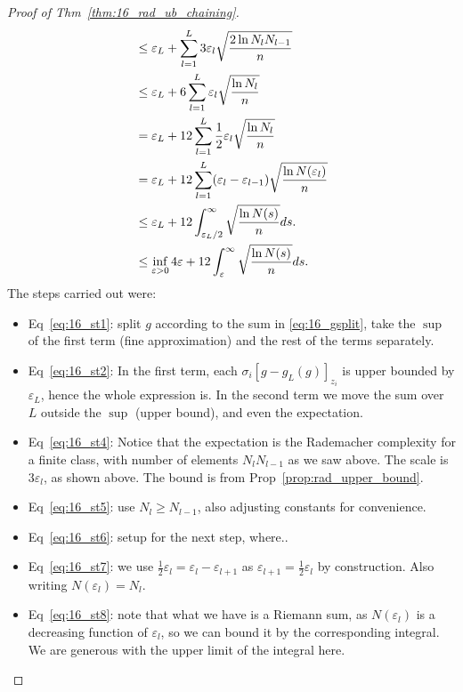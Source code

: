 \documentclass[twoside]{article}
\begin{document}
\begin{proof}[Proof of Thm~\ref{thm:16_rad_ub_chaining}]
\begin{align}
            & \leq \varepsilon_L + \sum_{l=1}^L  3 \varepsilon_l \sqrt{\frac{2 \ln N_l N_{l-1}}{n}}   \label{eq:16_st4}  \\
            & \leq \varepsilon_L + 6 \sum_{l=1}^L \varepsilon_l \sqrt{\frac{ \ln N_l }{n}}   \label{eq:16_st5}  \\
            & = \varepsilon_L + 12 \sum_{l=1}^L \frac12 \varepsilon_l \sqrt{\frac{ \ln N_l }{n}}   \label{eq:16_st6}  \\    
            & = \varepsilon_L + 12 \sum_{l=1}^L (\varepsilon_l-\varepsilon_{l-1}) \sqrt{\frac{ \ln N(\varepsilon_l) }{n}}   \label{eq:16_st7} \\    
            & \leq \varepsilon_L + 12 \int_{\varepsilon_L/2}^\infty \sqrt{\frac{ \ln N(s) }{n}} ds.   \label{eq:16_st8}  \\ 
            & \leq \inf_{\varepsilon > 0} 4 \varepsilon + 12 \int_\varepsilon^\infty \sqrt{ \frac{\ln N(s)}{n} } ds.      \label{eq:16_st9}     
    \end{align}
    The steps carried out were:
    \begin{itemize}
        \item Eq~\ref{eq:16_st1}: split $g$ according to the sum in \ref{eq:16_gsplit}, take the $\sup$ of the first term (fine approximation) and the rest of the terms separately.
        \item Eq~\ref{eq:16_st2}: In the first term, each $\sigma_i [g - g_L(g)]_{z_i}$ is upper bounded by $\varepsilon_L$, hence the whole expression is. In the second term we move the sum over $L$ outside the $\sup$ (upper bound), and even the expectation.
        \item Eq~\ref{eq:16_st4}: Notice that the expectation is the Rademacher complexity for a finite class, with number of elements $N_l N_{l-1}$ as we saw above. The scale is $3 \varepsilon_l$, as shown above. The bound is from Prop~\ref{prop:rad_upper_bound}. 
        \item Eq~\ref{eq:16_st5}: use $N_l \geq N_{l-1}$, also adjusting constants for convenience.
        \item Eq~\ref{eq:16_st6}: setup for the next step, where..
        \item Eq~\ref{eq:16_st7}: we use $\frac12 \varepsilon_l = \varepsilon_l - \varepsilon_{l+1}$ as $\varepsilon_{l+1} = \frac12 \varepsilon_l$ by construction. Also writing $N(\varepsilon_l) = N_l$.
        \item Eq~\ref{eq:16_st8}: note that what we have is a Riemann sum, as $N(\varepsilon_l)$ is a decreasing function of $\varepsilon_l$, so we can bound it by the corresponding integral. We are generous with the upper limit of the integral here.

\end{itemize}
\end{proof}
\end{document}
